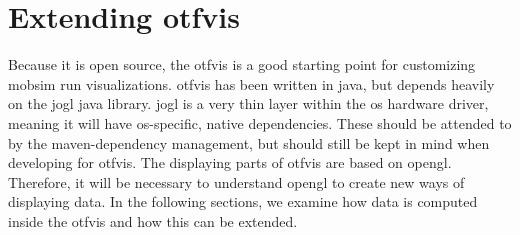 \section{Extending \gls{otfvis}}
Because it is open source, the \gls{otfvis} is a good starting point for customizing mobsim run visualizations. 
\gls{otfvis} has been written in \gls{java}, but depends heavily on the \gls{jogl} \gls{java} library.%
\gls{jogl} is a very thin layer within the \gls{os} hardware driver, meaning it will have \gls{os}-specific, native dependencies. 
These should be attended to by the maven-dependency management, but should still be kept in mind when developing for \gls{otfvis}. 
The displaying parts of \gls{otfvis} are based on \gls{opengl}. 
Therefore, it will be necessary to understand \gls{opengl} to create new ways of displaying data. 
In the following sections, we examine how data is computed inside the \gls{otfvis} and how this can be extended.

